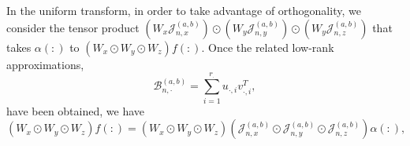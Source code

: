 \documentclass[11pt]{article}
\begin{document}
In the uniform transform, in order to take advantage of orthogonality, we consider the tensor product $(W_{x}\mathcal{J}_{n,x}^{(a,b)})\odot (W_{y}\mathcal{J}_{n,y}^{(a,b)})\odot (W_{y}\mathcal{J}_{n,z}^{(a,b)})$ that takes $\alpha(:)$ to $(W_{x}\odot W_{y}\odot W_{z})f(:)$. Once the related low-rank approximations, 
\begin{equation}
\label{eqn:Blr2}
\mathcal{B}_{n,\cdot}^{(a,b)} = \sum_{i=1}^{r_{\cdot}}u_{\cdot,i}v_{\cdot,i}^{T},
\end{equation}
have been obtained, we have
\begin{equation}
\label{eq:TJ3pre}
(W_{x}\odot W_{y}\odot W_{z})f(:) = (W_{x}\odot W_{y}\odot W_{z})(\mathcal{J}_{n,x}^{(a,b)}\odot \mathcal{J}_{n,y}^{(a,b)}\odot \mathcal{J}_{n,z}^{(a,b)})\alpha(:),
\end{equation}
{\color{blue}{where
}}
\end{document}
